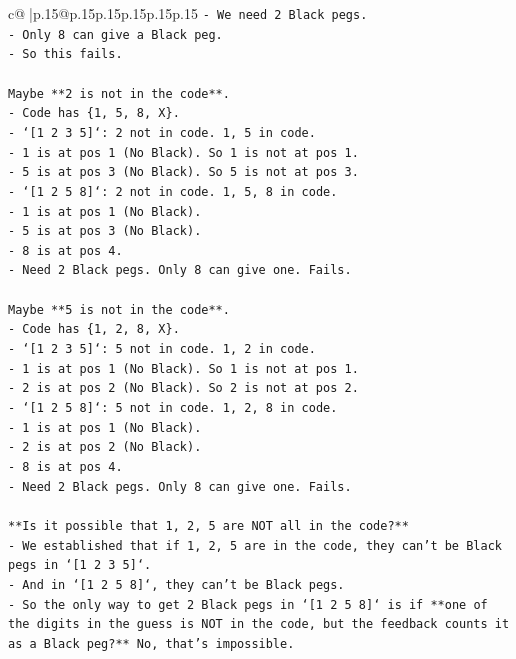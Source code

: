 \documentclass{article}
\begin{document}
{\begin{supertabular}{c@{$\;$}|p{.15\linewidth}@{}p{.15\linewidth}p{.15\linewidth}p{.15\linewidth}p{.15\linewidth}p{.15\linewidth}}
{{{\texttt{{-} We need 2 Black pegs.} \\
\texttt{{-} Only 8 can give a Black peg.} \\
\texttt{{-} So this fails.} \\
\\ 
\texttt{Maybe **2 is not in the code**.} \\
\texttt{{-} Code has \{1, 5, 8, X\}.} \\
\texttt{{-} `{[}1 2 3 5{]}`: 2 not in code. 1, 5 in code.} \\
\texttt{{-} 1 is at pos 1 (No Black). So 1 is not at pos 1.} \\
\texttt{{-} 5 is at pos 3 (No Black). So 5 is not at pos 3.} \\
\texttt{{-} `{[}1 2 5 8{]}`: 2 not in code. 1, 5, 8 in code.} \\
\texttt{{-} 1 is at pos 1 (No Black).} \\
\texttt{{-} 5 is at pos 3 (No Black).} \\
\texttt{{-} 8 is at pos 4.} \\
\texttt{{-} Need 2 Black pegs. Only 8 can give one. Fails.} \\
\\ 
\texttt{Maybe **5 is not in the code**.} \\
\texttt{{-} Code has \{1, 2, 8, X\}.} \\
\texttt{{-} `{[}1 2 3 5{]}`: 5 not in code. 1, 2 in code.} \\
\texttt{{-} 1 is at pos 1 (No Black). So 1 is not at pos 1.} \\
\texttt{{-} 2 is at pos 2 (No Black). So 2 is not at pos 2.} \\
\texttt{{-} `{[}1 2 5 8{]}`: 5 not in code. 1, 2, 8 in code.} \\
\texttt{{-} 1 is at pos 1 (No Black).} \\
\texttt{{-} 2 is at pos 2 (No Black).} \\
\texttt{{-} 8 is at pos 4.} \\
\texttt{{-} Need 2 Black pegs. Only 8 can give one. Fails.} \\
\\ 
\texttt{**Is it possible that 1, 2, 5 are NOT all in the code?**} \\
\texttt{{-} We established that if 1, 2, 5 are in the code, they can't be Black pegs in `{[}1 2 3 5{]}`.} \\
\texttt{{-} And in `{[}1 2 5 8{]}`, they can't be Black pegs.} \\
\texttt{{-} So the only way to get 2 Black pegs in `{[}1 2 5 8{]}` is if **one of the digits in the guess is NOT in the code, but the feedback counts it as a Black peg?** No, that's impossible.} \\
}}}
\end{supertabular}}
\end{document}
